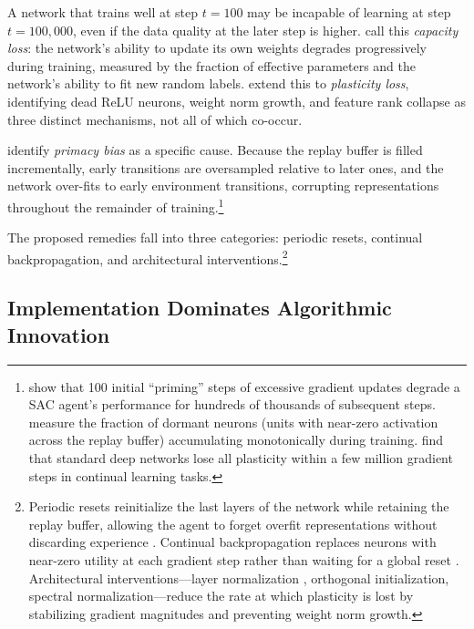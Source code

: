 A network that trains well at step $t = 100$ may be incapable of learning at step $t = 100{,}000$, even if the data quality at the later step is higher. \citet{Lyle2022} call this \emph{capacity loss}: the network's ability to update its own weights degrades progressively during training, measured by the fraction of effective parameters and the network's ability to fit new random labels. \citet{Lyle2023} extend this to \emph{plasticity loss}, identifying dead ReLU neurons, weight norm growth, and feature rank collapse as three distinct mechanisms, not all of which co-occur.

\citet{Nikishin2022} identify \emph{primacy bias} as a specific cause. Because the replay buffer is filled incrementally, early transitions are oversampled relative to later ones, and the network over-fits to early environment transitions, corrupting representations throughout the remainder of training.\footnote{\citet{Nikishin2022} show that 100 initial ``priming'' steps of excessive gradient updates degrade a SAC agent's performance for hundreds of thousands of subsequent steps. \citet{Sokar2023} measure the fraction of dormant neurons (units with near-zero activation across the replay buffer) accumulating monotonically during training. \citet{DohareEtAl2024} find that standard deep networks lose all plasticity within a few million gradient steps in continual learning tasks.}

The proposed remedies fall into three categories: periodic resets, continual backpropagation, and architectural interventions.\footnote{Periodic resets reinitialize the last layers of the network while retaining the replay buffer, allowing the agent to forget overfit representations without discarding experience \citep{Nikishin2022, Doro2023}. Continual backpropagation replaces neurons with near-zero utility at each gradient step rather than waiting for a global reset \citep{DohareEtAl2024}. Architectural interventions---layer normalization \citep{Lyle2025}, orthogonal initialization, spectral normalization---reduce the rate at which plasticity is lost by stabilizing gradient magnitudes and preventing weight norm growth.}

\subsection{Implementation Dominates Algorithmic Innovation}
\label{sec:implementation}

